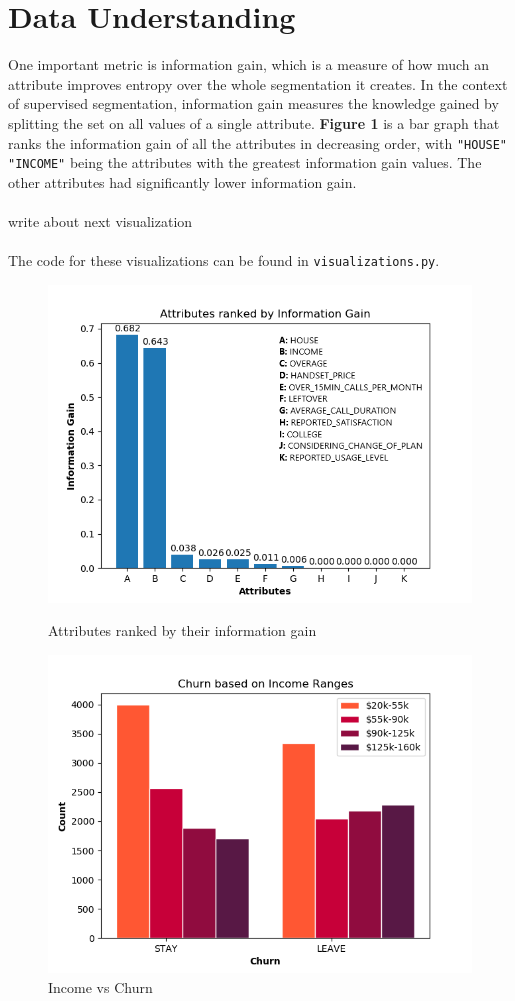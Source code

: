 \documentclass[12pt, notitlepage]{article}
\begin{document}
\section{Data Understanding}
One important metric is information gain, which is a measure of how much an attribute improves entropy over the whole segmentation it creates. In the context of supervised segmentation, information gain measures the knowledge gained by splitting the set on all values of a single attribute. \textbf{Figure 1} is a bar graph that ranks the information gain of all the attributes in decreasing order, with \texttt{"HOUSE"} \texttt{"INCOME"} being the attributes with the greatest information gain values. The other attributes had significantly lower information gain.\\\\
write about next visualization\\\\
The code for these visualizations can be found in \texttt{visualizations.py}. 
\begin{figure}[H]
	\centering
	\includegraphics[scale=0.8]{InformationGain.png}
	\caption{Attributes ranked by their information gain}
	\centering 
	\includegraphics[scale=0.8]{IncomeVsChurn.png}
	\caption{Income vs Churn}
\end{figure}
\end{document}
